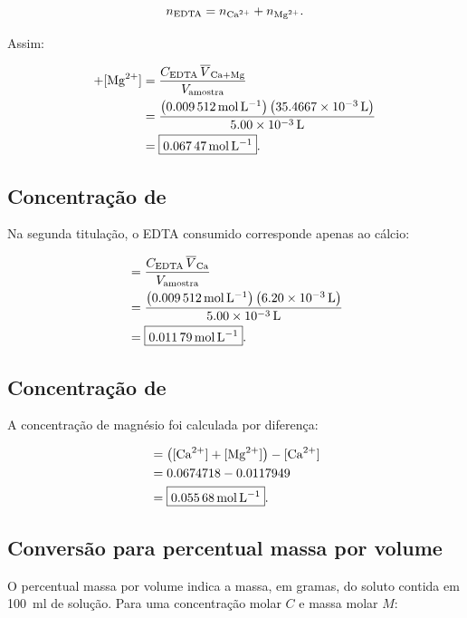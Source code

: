 \documentclass[a4paper,12pt]{article}
\begin{document}
\begin{equation}
n_{\mathrm{EDTA}}=n_{\ce{Ca^2+}}+n_{\ce{Mg^2+}}.
\end{equation}

Assim:

\begin{align}
[\ce{Ca^2+}]+[\ce{Mg^2+}]
&=
\frac{C_{\mathrm{EDTA}}\,\overline{V}_{\ce{Ca + Mg}}}
{V_{\mathrm{amostra}}}\\
&=
\frac{
\left(\qty{0.009512}{\mole\per\litre}\right)
\left(\qty{35.4667e-3}{\litre}\right)}
{\qty{5.00e-3}{\litre}}\\
&=
\boxed{\qty{0.06747}{\mole\per\litre}}.
\end{align}

\subsection{Concentração de }

Na segunda titulação, o EDTA consumido corresponde apenas ao cálcio:

\begin{align}
[\ce{Ca^2+}]
&=
\frac{C_{\mathrm{EDTA}}\,\overline{V}_{\ce{Ca}}}
{V_{\mathrm{amostra}}}\\
&=
\frac{
\left(\qty{0.009512}{\mole\per\litre}\right)
\left(\qty{6.20e-3}{\litre}\right)}
{\qty{5.00e-3}{\litre}}\\
&=
\boxed{\qty{0.01179}{\mole\per\litre}}.
\end{align}

\subsection{Concentração de }

A concentração de magnésio foi calculada por diferença:

\begin{align}
[\ce{Mg^2+}]
&=
\left([\ce{Ca^2+}]+[\ce{Mg^2+}]\right)-[\ce{Ca^2+}]\\
&=
0.0674718-0.0117949\\
&=
\boxed{\qty{0.05568}{\mole\per\litre}}.
\end{align}

\subsection{Conversão para percentual massa por volume}

O percentual massa por volume indica a massa, em gramas, do soluto contida
em \qty{100}{\milli\litre} de solução. Para uma concentração molar $C$ e
massa molar $M$:
\end{document}
